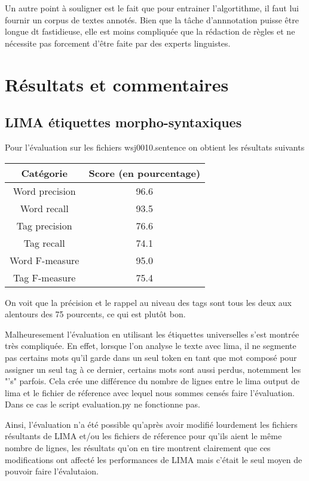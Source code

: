 \documentclass[12pt]{report}
\begin{document}
Un autre point à souligner est le fait que pour entrainer l'algortithme, il faut lui fournir un corpus de textes annotés. Bien que la tâche d'annnotation puisse être longue dt fastidieuse, elle est moins compliquée que la rédaction de règles et ne nécessite pas forcement d'être faite par des experts linguistes.

\newpage
\section{Résultats et commentaires}
\subsection{LIMA étiquettes morpho-syntaxiques}

Pour l'évaluation sur les fichiers wsj0010.sentence on obtient les résultats suivants

\begin{tabular}{c c}
\hline
  Catégorie & Score (en pourcentage) \\
\hline
    Word precision & 96.6 \\
    Word recall & 93.5 \\
    Tag precision & 76.6 \\
    Tag recall & 74.1 \\
    Word F-measure & 95.0 \\
    Tag F-measure & 75.4 \\
    
\end{tabular}

On voit que la précision et le rappel au niveau des tags sont tous les deux aux alentours des 75 pourcents, ce qui est plutôt bon.

Malheuresement l'évaluation en utilisant les étiquettes universelles s'est montrée très compliquée. En effet, lorsque l'on analyse le texte avec lima, il ne segmente pas certains mots qu'il garde dans un seul token en tant que mot composé pour assigner un seul tag à ce dernier, certains mots sont aussi perdus, notemment les "'s" parfois. Cela crée une différence du nombre de lignes entre le lima output de lima et le fichier de réference avec lequel nous sommes censés faire l'évaluation. Dans ce cas le script evaluation.py ne fonctionne pas.

Ainsi, l'évaluation n'a été possible qu'après avoir modifié lourdement les fichiers résultants de LIMA et/ou les fichiers de réference pour qu'ils aient le même nombre de lignes, les résultats qu'on en tire montrent clairement que ces modifications ont affecté les performances de LIMA mais c'était le seul moyen de pouvoir faire l'évalutaion.
\end{document}
